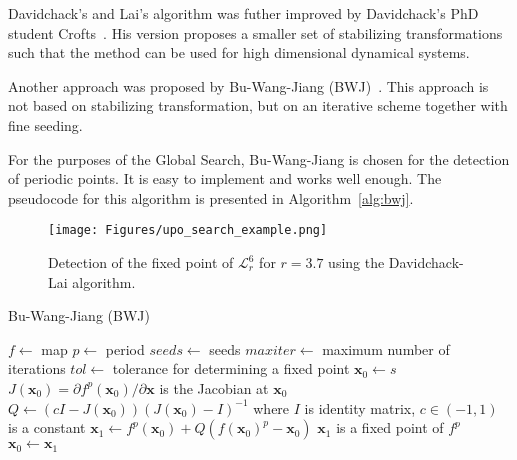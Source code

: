 \par
Davidchack's and Lai's algorithm was futher improved by Davidchack's PhD student Crofts~\cite{Crofts2005,Crofts2007,Crofts2008,Crofts20090901}.
His version proposes a smaller set of stabilizing transformations such that the method can be used for high dimensional dynamical systems.
\par
Another approach was proposed by Bu-Wang-Jiang (BWJ)~\cite{Bu2004}.
This approach is not based on stabilizing transformation, but on an iterative scheme together with fine seeding.
\par
For the purposes of the Global Search, Bu-Wang-Jiang is chosen for the detection of periodic points.
It is easy to implement and works well enough.
The pseudocode for this algorithm is presented in Algorithm~\ref{alg:bwj}.

\begin{figure}[!h]
    \centering
    \texttt{[image: Figures/upo\_search\_example.png]}
    \caption{
        Detection of the fixed point of $\mathcal{L}_{r}^{6}$ for $r = 3.7$ using the Davidchack-Lai algorithm.
    }
    \label{fig:upo_search_example}
\end{figure}

\begin{algorithm}[!h]
    \caption{Bu-Wang-Jiang (BWJ)}
    \label{alg:bwj}
    \begin{algorithmic}[1]
        \Statex $f \gets$ map
        \Statex $p \gets$ period
        \Statex $seeds \gets$ seeds
        \Statex $maxiter \gets$ maximum number of iterations
        \Statex $tol \gets$ tolerance for determining a fixed point
            \State $\textbf{x}_{0} \gets s$
                \State $J(\textbf{x}_{0}) = \partial f^{p}(\textbf{x}_{0}) / \partial \textbf{x}$ is the Jacobian at $\textbf{x}_{0}$
                \State $Q \gets (cI-J(\textbf{x}_{0}))(J(\textbf{x}_{0})-I)^{-1}$ where $I$ is identity matrix, $c \in (-1, 1)$ is a constant 
                \State $\textbf{x}_1 \gets f^{p}(\textbf{x}_{0}) + Q(f(\textbf{x}_{0})^{p}-\textbf{x}_{0})$
                    \State $\textbf{x}_{1}$ is a fixed point of $f^{p}$
                \EndIf
                \State $\textbf{x}_{0} \gets \textbf{x}_{1}$
            \EndWhile
        \EndFor
    \end{algorithmic}
\end{algorithm}

